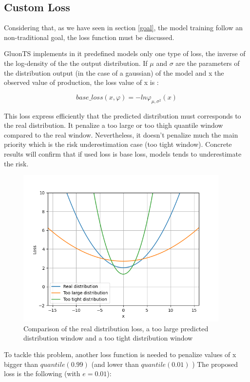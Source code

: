 \documentclass[a4paper, 12pt]{article}
\begin{document}
  \subsection{Custom Loss} \label{loss}

Considering that, as we have seen in section \ref{goal}, the model training follow an non-traditional goal, the loss function must be discussed.

GluonTS implements in it predefined models only one type of loss, the inverse of the log-density of the the output distribution. 
If $ \mu $ and $ \sigma $ are the parameters of the distribution output (in the case of a gaussian) of the model and x the observed value of production, the loss value of x is : 

\begin{equation}
    base\_loss(x, \varphi ) = - ln \varphi_{\mu,\sigma^2}(x)  
\end{equation}

This loss express efficiently that the predicted distribution must corresponds to the real distribution.
It penalize a too large or too thigh quantile window compared to the real window.
Nevertheless, it doesn't penalize much the main priority which is the risk underestimation case (too tight window). Concrete results will confirm that if used loss is base loss, models tends to underestimate the risk. 

\begin{figure}[!h]
    \centering
    \includegraphics[width=400px]{distribution_comp.png}
    \caption{Comparison of the real distribution loss, a too large predicted distribution window and a too tight distribution window}
    \label{fig:distrib_comp}
\end{figure}

To tackle this problem, another loss function is needed to penalize values of x bigger than $quantile(0.99)$ (and lower than 
$quantile(0.01)$ )
The proposed loss is the following (with $e = 0.01$):
\end{document}
